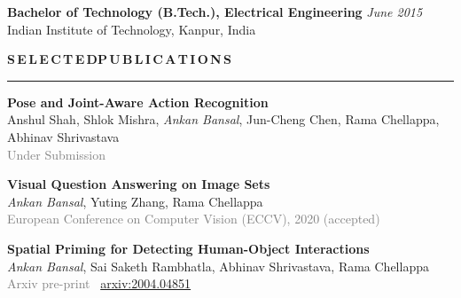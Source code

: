 \documentclass[11pt, a4paper]{article}
\begin{document}
\vspace{3pt}

\textbf{Bachelor of Technology (B.Tech.), Electrical Engineering} \hfill  \textit{June 2015} \\
Indian Institute of Technology, Kanpur, India


\vspace{10pt}

%

\textbf{S\,E\,L\,E\,C\,T\,E\,D{\hspace{0.6em}}P\,U\,B\,L\,I\,C\,A\,T\,I\,O\,N\,S}
\vspace{5pt}
\hrule
\vspace{7pt}

\textbf{Pose and Joint-Aware Action Recognition}\\
Anshul Shah, Shlok Mishra, \textit{Ankan Bansal}, Jun-Cheng Chen, Rama Chellappa, Abhinav
Shrivastava\\ 
\textcolor{gray}{Under Submission}

\vspace{4pt}


\textbf{Visual Question Answering on Image Sets}\\
\textit{Ankan Bansal}, Yuting Zhang, Rama Chellappa\\
\textcolor{gray}{European Conference on Computer Vision (ECCV), 2020 (accepted)}

\vspace{4pt}

\textbf{Spatial Priming for Detecting Human-Object Interactions}\\
\textit{Ankan Bansal}, Sai Saketh Rambhatla, Abhinav Shrivastava, Rama Chellappa\\
\textcolor{gray}{Arxiv pre-print} ~\href{https://arxiv.org/abs/2004.04851}{arxiv:2004.04851}
\end{document}
